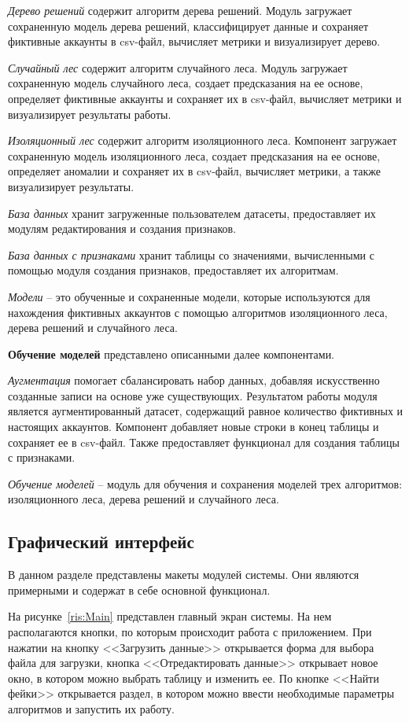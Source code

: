 \textit{Дерево решений} содержит алгоритм дерева решений. Модуль загружает сохраненную модель дерева решений, классифицирует данные и сохраняет фиктивные аккаунты в csv-файл, вычисляет метрики и визуализирует дерево.

\textit{Случайный лес} содержит алгоритм случайного леса. Модуль загружает сохраненную модель случайного леса, создает предсказания на ее основе, определяет фиктивные аккаунты и сохраняет их в csv-файл, вычисляет метрики и визуализирует результаты работы.

\textit{Изоляционный лес} содержит алгоритм изоляционного леса. Компонент загружает сохраненную модель изоляционного леса, создает предсказания на ее основе, определяет аномалии и сохраняет их в csv-файл, вычисляет метрики, а также визуализирует результаты.

\textit{База данных} хранит загруженные пользователем датасеты, предоставляет их модулям редактирования и создания признаков.

\textit{База данных с признаками} хранит таблицы со значениями, вычисленными с помощью модуля создания признаков, предоставляет их алгоритмам.

\textit{Модели} -- это обученные и сохраненные модели, которые используются для нахождения фиктивных аккаунтов с помощью алгоритмов изоляционного леса, дерева решений и случайного леса.

\textbf{Обучение моделей} представлено описанными далее компонентами.

\textit{Аугментация} помогает сбалансировать набор данных, добавляя искусственно созданные записи на основе уже существующих. Результатом работы модуля является аугментированный датасет, содержащий равное количество фиктивных и настоящих аккаунтов. Компонент добавляет новые строки в конец таблицы и сохраняет ее в csv-файл. Также предоставляет функционал для создания таблицы с признаками.

\textit{Обучение моделей} -- модуль для обучения и сохранения моделей трех алгоритмов: изоляционного леса, дерева решений и случайного леса. 


\vspace{1.5em}
\subsection{Графический интерфейс}
\label{subsec:Graphic}
В данном разделе представлены макеты модулей системы. Они являются примерными и содержат в себе основной функционал.

На рисунке~\ref{ris:Main} представлен главный экран системы. На нем располагаются кнопки, по которым происходит работа с приложением. При нажатии на кнопку <<Загрузить данные>> открывается форма для выбора файла для загрузки, кнопка <<Отредактировать данные>> открывает новое окно, в котором можно выбрать таблицу и изменить ее. По кнопке <<Найти фейки>> открывается раздел, в котором можно ввести необходимые параметры алгоритмов и запустить их работу.

